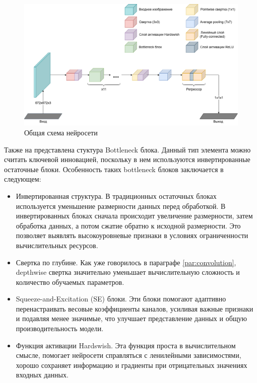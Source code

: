 \begin{figure}[ht] 
	\center
	\includegraphics [scale=0.4] {my_folder/images/FocusNet-FocusNet2.png}
	\caption{Общая схема нейросети} 
	\label{fig:FocusNet}
\end{figure}

Также на  представлена стуктура Bottleneck блока. Данный тип элемента можно считать ключевой инновацией, поскольку в нем используются инвертированные остаточные блоки. Особенность таких bottleneck блоков заключается в следующем:
\begin{itemize}
	\item Инвертированная структура. В традиционных остаточных блоках используется уменьшение размерности данных перед обработкой. В инвертированных блоках сначала происходит увеличение размерности, затем обработка данных, а потом сжатие обратно к исходной размерности. Это позволяет выявлять высокоуровневые признаки в условиях ограниченности вычислительных ресурсов.
	
	\item Свертка по глубине. Как уже говорилось в параграфе \ref{par:convolution}, depthwise свертка значительно уменьшает вычислительную сложность и количество обучаемых параметров.
	
	\item Squeeze-and-Excitation (SE) блоки. Эти блоки помогают адаптивно перенастраивать весовые коэффициенты каналов, усиливая важные признаки и подавляя менее значимые, что улучшает представление данных и общую производительность модели.
	
	\item Функция активации Hardswish. Эта функция проста в вычислительном смысле, помогает нейросети справляться с ленилейными зависимостями, хорошо сохраняет информацию и градиенты при отрицательных значениях входных данных.
\end{itemize}

